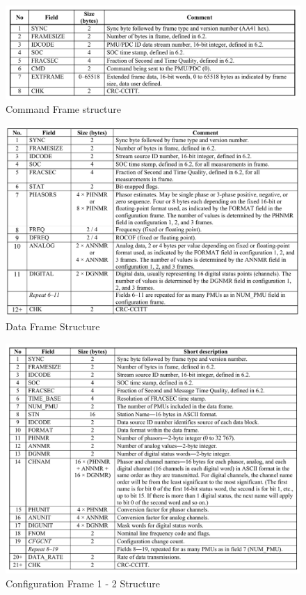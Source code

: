 \begin{appendix}
\begin{figure}[h]
	\includegraphics[width=\textwidth]{fig/cmd_frame.png}
	\caption{Command Frame structure \cite{c37.118.2}}
\end{figure}

\begin{figure}[h]
	\includegraphics[width=\textwidth]{fig/data_frame.png}
	\caption{Data Frame Structure \cite{c37.118.2} }
\end{figure} 


\begin{figure}[h]
	\includegraphics[width=\textwidth]{fig/cfg_frame12.png}
	\caption{Configuration Frame 1 - 2 Structure \cite{c37.118.2}}
	\label{fig:cfg_12}
\end{figure} 


\end{appendix}
